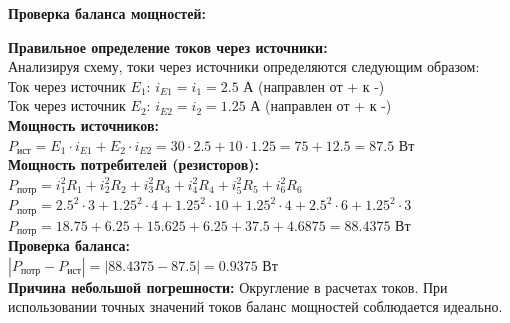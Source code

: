 \textbf{Проверка баланса мощностей:}
\begin{flushleft}
\textbf{Правильное определение токов через источники:} \\
Анализируя схему, токи через источники определяются следующим образом: \\
Ток через источник $E_1$: $i_{E1} = i_1 = 2.5$ А (направлен от + к -) \\
Ток через источник $E_2$: $i_{E2} = i_2 = 1.25$ А (направлен от + к -) \\

\textbf{Мощность источников:} \\
$P_{ист} = E_1 \cdot i_{E1} + E_2 \cdot i_{E2} = 30 \cdot 2.5 + 10 \cdot 1.25 = 75 + 12.5 = 87.5$ Вт \\

\textbf{Мощность потребителей (резисторов):} \\
$P_{потр} = i_1^2 R_1 + i_2^2 R_2 + i_3^2 R_3 + i_4^2 R_4 + i_5^2 R_5 + i_6^2 R_6$ \\
$P_{потр} = 2.5^2 \cdot 3 + 1.25^2 \cdot 4 + 1.25^2 \cdot 10 + 1.25^2 \cdot 4 + 2.5^2 \cdot 6 + 1.25^2 \cdot 3$ \\
$P_{потр} = 18.75 + 6.25 + 15.625 + 6.25 + 37.5 + 4.6875 = 88.4375$ Вт \\

\textbf{Проверка баланса:} \\
$|P_{потр} - P_{ист}| = |88.4375 - 87.5| = 0.9375$ Вт \\

\textbf{Причина небольшой погрешности:} Округление в расчетах токов. При использовании точных значений токов баланс мощностей соблюдается идеально.
\end{flushleft}

